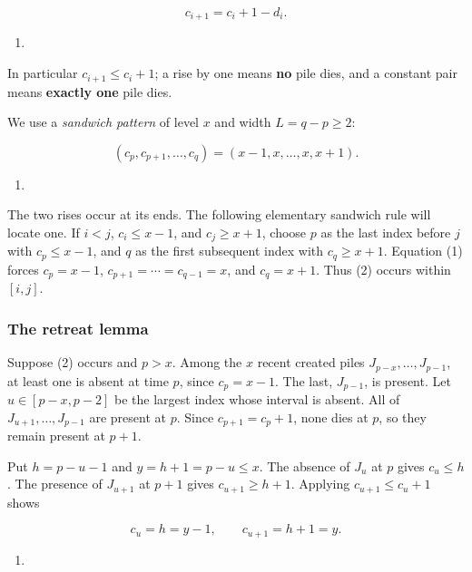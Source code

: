 \documentclass[11pt,a4paper]{article}
\providecommand{\tightlist}{\setlength{\itemsep}{0pt}\setlength{\parskip}{0pt}}
\begin{document}
\[
c_{i+1}=c_i+1-d_i.
\]

\begin{enumerate}
\def\labelenumi{(\arabic{enumi})}
\tightlist
\item
\end{enumerate}

In particular \(c_{i+1}\le c_i+1\); a rise by one means \textbf{no} pile dies, and a constant pair means \textbf{exactly one} pile dies.

We use a \emph{sandwich pattern} of level \(x\) and width \(L=q-p\ge2\):

\[
(c_p,c_{p+1},\ldots,c_q)=(x-1,x,\ldots,x,x+1).
\]

\begin{enumerate}
\def\labelenumi{(\arabic{enumi})}
\setcounter{enumi}{1}
\tightlist
\item
\end{enumerate}

The two rises occur at its ends. The following elementary sandwich rule will locate one. If \(i<j\), \(c_i\le x-1\), and \(c_j\ge x+1\), choose \(p\) as the last index before \(j\) with \(c_p\le x-1\), and \(q\) as the first subsequent index with \(c_q\ge x+1\). Equation (1) forces \(c_p=x-1\), \(c_{p+1}=\cdots=c_{q-1}=x\), and \(c_q=x+1\). Thus (2) occurs within \([i,j]\).

\subsubsection{The retreat lemma}\label{the-retreat-lemma}

Suppose (2) occurs and \(p>x\). Among the \(x\) recent created piles \(J_{p-x},\ldots,J_{p-1}\), at least one is absent at time \(p\), since \(c_p=x-1\). The last, \(J_{p-1}\), is present. Let \(u\in[p-x,p-2]\) be the largest index whose interval is absent. All of \(J_{u+1},\ldots,J_{p-1}\) are present at \(p\). Since \(c_{p+1}=c_p+1\), none dies at \(p\), so they remain present at \(p+1\).

Put \(h=p-u-1\) and \(y=h+1=p-u\le x\). The absence of \(J_u\) at \(p\) gives \(c_u\le h\). The presence of \(J_{u+1}\) at \(p+1\) gives \(c_{u+1}\ge h+1\). Applying \(c_{u+1}\le c_u+1\) shows

\[
c_u=h=y-1,\qquad c_{u+1}=h+1=y.
\]

\begin{enumerate}
\def\labelenumi{(\arabic{enumi})}
\setcounter{enumi}{2}
\tightlist
\item
\end{enumerate}
\end{document}
